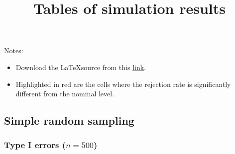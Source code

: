 \documentclass[
]{article}
\title{Tables of simulation results}
\author{}
\date{\vspace{-2.5em}}
\begin{document}
\maketitle

{
\setcounter{tocdepth}{3}
\tableofcontents
}
Notes:

\begin{itemize}
\item
  Download the \LaTeX source from this
  \href{https://raw.githubusercontent.com/haziqj/lavaan.bingof/gh-pages/articles/sim_tables.tex}{link}.
\item
  Highlighted in red are the cells where the rejection rate is
  significantly different from the nominal level.
\end{itemize}

\subsection{Simple random sampling}\label{simple-random-sampling}

\subsubsection{\texorpdfstring{Type I errors
(\(n=500\))}{Type I errors (n=500)}}\label{type-i-errors-n500}
\end{document}
